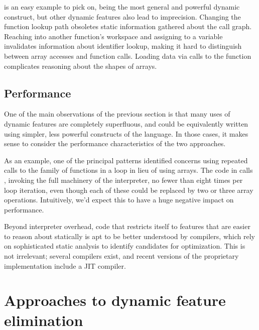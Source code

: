  is an easy example to pick on, being the most general and powerful
dynamic construct, but other dynamic features also lead to imprecision.
Changing the function lookup path obsoletes static information gathered about
the call graph. Reaching into another function's workspace and assigning to a
variable invalidates information about identifier lookup, making it hard to
distinguish between array accesses and function calls. Loading data via calls
to the  function complicates reasoning about the shapes of arrays.

\subsection{Performance}

One of the main observations of the previous section is that many uses of
dynamic features are completely superfluous, and could be equivalently written
using simpler, less powerful constructs of the language. In those cases, it
makes sense to consider the performance characteristics of the two approaches.

As an example, one of the principal patterns identified concerns using repeated
calls to the  family of functions in a loop in lieu of using arrays.
The code in  calls , invoking the full
machinery of the interpreter, no fewer than eight times per loop iteration,
even though each of these could be replaced by two or three array operations.
Intuitively, we'd expect this to have a huge negative impact on performance.

Beyond interpreter overhead, code that restricts itself to features that are
easier to reason about statically is apt to be better understood by compilers,
which rely on sophisticated static analysis to identify candidates for
optimization. This is not irrelevant; several \matlab compilers exist, and
recent versions of the proprietary \matlab implementation include a JIT
compiler. %


\section{Approaches to dynamic feature elimination}
